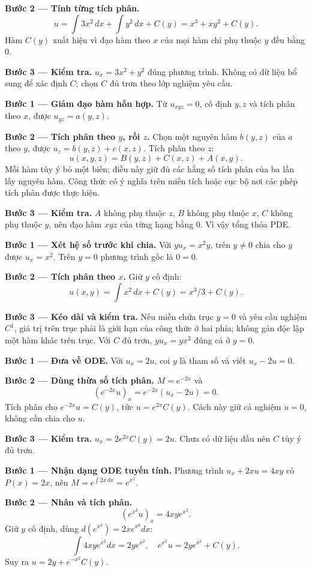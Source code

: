 \textbf{Bước 2 — Tính từng tích phân.}
\[u=\int3x^2\,dx+\int y^2\,dx+C(y)=x^3+xy^2+C(y).\]
Hàm $C(y)$ xuất hiện vì đạo hàm theo $x$ của mọi hàm chỉ phụ thuộc $y$ đều bằng 0.

\textbf{Bước 3 — Kiểm tra.} $u_x=3x^2+y^2$ đúng phương trình. Không có dữ liệu bổ sung để xác định $C$; chọn $C$ đủ trơn theo lớp nghiệm yêu cầu.

\textbf{Bước 1 — Giảm đạo hàm hỗn hợp.} Từ $u_{xyz}=0$, cố định $y,z$ và tích phân theo $x$, được $u_{yz}=a(y,z)$.

\textbf{Bước 2 — Tích phân theo $y$, rồi $z$.} Chọn một nguyên hàm $b(y,z)$ của $a$ theo $y$, được $u_z=b(y,z)+c(x,z)$. Tích phân theo $z$:
\[u(x,y,z)=B(y,z)+C(x,z)+A(x,y).\]
Mỗi hàm tùy ý bỏ một biến; điều này giữ đủ các hằng số tích phân của ba lần lấy nguyên hàm. Công thức có ý nghĩa trên miền tích hoặc cục bộ nơi các phép tích phân được thực hiện.

\textbf{Bước 3 — Kiểm tra.} $A$ không phụ thuộc $z$, $B$ không phụ thuộc $x$, $C$ không phụ thuộc $y$, nên đạo hàm $xyz$ của từng hạng bằng 0. Vì vậy tổng thỏa PDE.

\textbf{Bước 1 — Xét hệ số trước khi chia.} Với $yu_x=x^2y$, trên $y\ne0$ chia cho $y$ được $u_x=x^2$. Trên $y=0$ phương trình gốc là $0=0$.

\textbf{Bước 2 — Tích phân theo $x$.} Giữ $y$ cố định:
\[u(x,y)=\int x^2\,dx+C(y)=x^3/3+C(y).\]

\textbf{Bước 3 — Kéo dài và kiểm tra.} Nếu miền chứa trục $y=0$ và yêu cầu nghiệm $C^1$, giá trị trên trục phải là giới hạn của công thức ở hai phía; không gán độc lập một hàm khác trên trục. Với $C$ đủ trơn, $yu_x=yx^2$ đúng cả ở $y=0$.

\textbf{Bước 1 — Đưa về ODE.} Với $u_x=2u$, coi $y$ là tham số và viết $u_x-2u=0$.

\textbf{Bước 2 — Dùng thừa số tích phân.} $M=e^{-2x}$ và
\[(e^{-2x}u)_x=e^{-2x}(u_x-2u)=0.\]
Tích phân cho $e^{-2x}u=C(y)$, tức $u=e^{2x}C(y)$. Cách này giữ cả nghiệm $u=0$, không cần chia cho $u$.

\textbf{Bước 3 — Kiểm tra.} $u_x=2e^{2x}C(y)=2u$. Chưa có dữ liệu đầu nên $C$ tùy ý đủ trơn.

\textbf{Bước 1 — Nhận dạng ODE tuyến tính.} Phương trình $u_x+2xu=4xy$ có $P(x)=2x$, nên $M=e^{\int2x\,dx}=e^{x^2}$.

\textbf{Bước 2 — Nhân và tích phân.}
\[(e^{x^2}u)_x=4xy e^{x^2}.\]
Giữ $y$ cố định, dùng $d(e^{x^2})=2xe^{x^2}dx$:
\[\int4xy e^{x^2}dx=2y e^{x^2},\quad e^{x^2}u=2y e^{x^2}+C(y).\]
Suy ra $u=2y+e^{-x^2}C(y)$.

